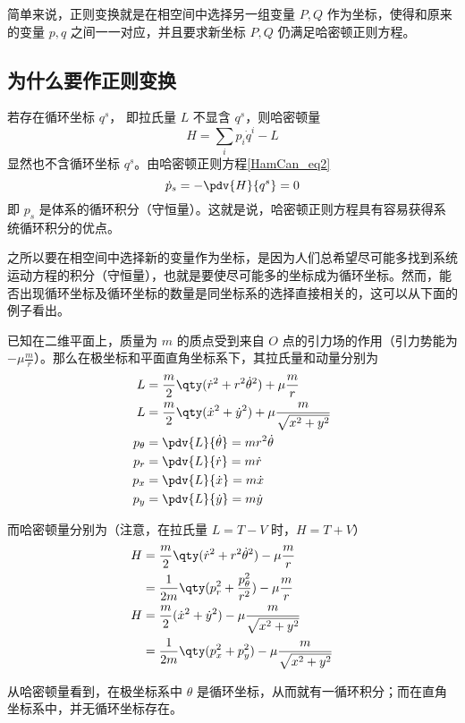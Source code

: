 

简单来说，正则变换就是在相空间中选择另一组变量 $P,Q$ 作为坐标，使得和原来的变量 $p,q$ 之间一一对应，并且要求新坐标 $P,Q$ 仍满足哈密顿正则方程。
\subsection{为什么要作正则变换}
若存在循环坐标 $q^s$， 即拉氏量 $L$ 不显含 $q^s$，则哈密顿量
\begin{equation}
H=\sum_i p_i\dot q^i-L
\end{equation}
显然也不含循环坐标 $q^s$。由哈密顿正则方程\autoref{HamCan_eq2}~
\begin{equation}\label{CanTra_eq7}
\dot p_s=-\pdv{H}{q^s}=0
\end{equation}
即 $p_s$ 是体系的循环积分（守恒量）。这就是说，哈密顿正则方程具有容易获得系统循环积分的优点。

之所以要在相空间中选择新的变量作为坐标，是因为人们总希望尽可能多找到系统运动方程的积分（守恒量），也就是要使尽可能多的坐标成为循环坐标。然而，能否出现循环坐标及循环坐标的数量是同坐标系的选择直接相关的，这可以从下面的例子看出。
\begin{example}{}
已知在二维平面上，质量为 $m$ 的质点受到来自 $O$ 点的引力场的作用（引力势能为 $-\mu\frac{m}{r}$）。那么在极坐标和平面直角坐标系下，其拉氏量和动量分别为
\begin{equation}
\begin{aligned}
L&=\frac{m}{2}\qty(\dot r^2+r^2\dot\theta^2)+\mu\frac{m}{r}\\
L&=\frac{m}{2}\qty(\dot x^2+\dot y^2)+\mu\frac{m}{\sqrt{x^2+y^2}}\\
p_\theta&=\pdv{L}{\dot \theta}=mr^2\dot\theta\\
p_r&=\pdv{L}{\dot r}=m\dot r\\
p_x&=\pdv{L}{\dot x}=m\dot x\\
p_y&=\pdv{L}{\dot y}=m\dot y
\end{aligned}
\end{equation}

而哈密顿量分别为（注意，在拉氏量 $L=T-V$ 时，$H=T+V$）
\begin{equation}
\begin{aligned}
H&=\frac{m}{2}\qty(\dot r^2+r^2\dot\theta^2)-\mu\frac{m}{r}\\
&=\frac{1}{2m}\qty(p_r^2+\frac{p_\theta^2}{r^2})-\mu\frac{m}{r}\\
H&=\frac{m}{2}(\dot x^2+\dot y^2)-\mu\frac{m}{\sqrt{x^2+y^2}}\\
&=\frac{1}{2m}\qty(p_x^2+p_y^2)-\mu\frac{m}{\sqrt{x^2+y^2}}
\end{aligned}
\end{equation}

从哈密顿量看到，在极坐标系中 $\theta$ 是循环坐标，从而就有一循环积分；而在直角坐标系中，并无循环坐标存在。 
\end{example}

